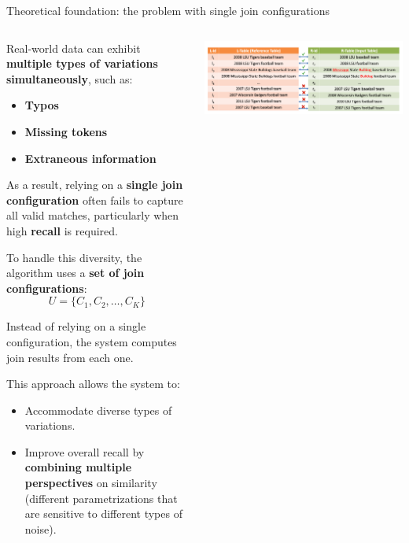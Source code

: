 \documentclass[8pt]{beamer} %
\begin{document}
\begin{frame}{Theoretical foundation: the problem with single join configurations}
	
	\begin{columns}
		\begin{column}{0.52\textwidth}
			Real-world data can exhibit \textbf{multiple types of variations simultaneously}, such as:
			\begin{itemize}
				\item \textbf{Typos}
				\item \textbf{Missing tokens}
				\item \textbf{Extraneous information}
			\end{itemize}
			
			As a result, relying on a \textbf{single join configuration} often fails to capture all valid matches, particularly when high \textbf{recall} is required.
			
			\vspace{0.5em}
			To handle this diversity, the algorithm uses a \textbf{set of join configurations}:
			$$
			U = \{C_1, C_2, \dots, C_K\}
			$$
			
			Instead of relying on a single configuration, the system computes join results from each one.
			
			This approach allows the system to:
			\begin{itemize}
				\item Accommodate diverse types of variations.
				\item Improve overall recall by \textbf{combining multiple perspectives} on similarity (different parametrizations that are sensitive to different types of noise).
			\end{itemize}
		\end{column}
		
		
		\begin{column}{0.45\textwidth}
			\centering
			\includegraphics[width=\linewidth]{img/Pasted image 20250331152324.png}
			

\end{column}
\end{columns}
\end{frame}
\end{document}
